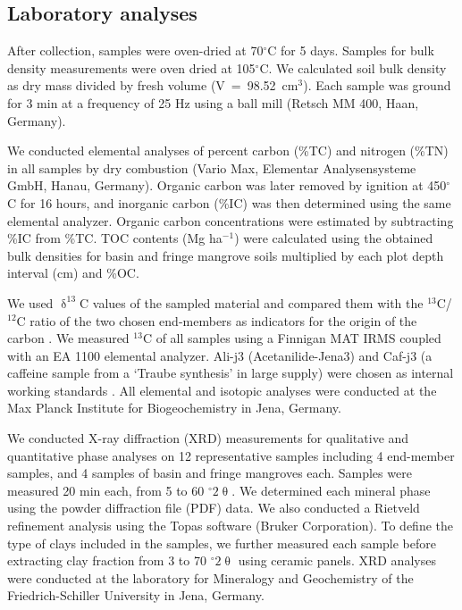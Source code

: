 \subsection{Laboratory analyses}
After collection, samples were oven-dried at 70$^{\circ}$C for 5 days. Samples for bulk density measurements were oven dried at 105$^{\circ}$C. We calculated soil bulk density as dry mass divided by fresh volume \mbox{(V = 98.52 cm$^3$)}. Each sample was ground for 3 min at a frequency of 25 Hz using a ball mill (Retsch MM 400, Haan, Germany). 

We conducted elemental analyses of percent  carbon (\%TC) and nitrogen (\%TN) in all samples by dry combustion (Vario Max, Elementar Analysensysteme GmbH, Hanau, Germany). Organic carbon was later removed by ignition at 450$^{\circ}$C for 16 hours, and inorganic carbon  (\%IC) was then determined using the same elemental analyzer. Organic carbon concentrations were estimated by subtracting \%IC from \%TC. TOC contents (Mg ha$^{-1}$) were calculated using the obtained bulk densities for basin and fringe mangrove soils multiplied by each plot depth interval (cm) and \%OC.

We used $\updelta^{13}$C values of the sampled material and compared them with the  $^{13}$C/$^{12}$C ratio of the two chosen end-members as indicators for the origin of the carbon \citep{Fry2006}. We measured $^{13}$C of all samples using a Finnigan MAT IRMS coupled with an EA 1100 elemental analyzer. Ali-j3 (Acetanilide-Jena3) and Caf-j3 (a caffeine sample from a `Traube synthesis' in large supply) were chosen as internal working standards \citep{werner2001}. All elemental and isotopic analyses were conducted at the Max Planck Institute for Biogeochemistry in Jena, Germany.

We conducted X-ray diffraction (XRD) measurements for qualitative and quantitative phase analyses \citep{spiess2009} on 12 representative samples including 4 end-member samples, and 4 samples of basin and fringe mangroves each. Samples were measured 20 min each, from 5 to 60 $^{\circ}2\uptheta$. We determined each mineral phase using the powder diffraction file (PDF) data. We also conducted a Rietveld refinement analysis using the Topas software (Bruker Corporation). To define the type of clays included in the samples, we further measured each sample before extracting clay fraction from 3 to 70 $^{\circ}2\uptheta$ using ceramic panels. XRD analyses were conducted at the laboratory for Mineralogy and Geochemistry of the Friedrich-Schiller University in Jena, Germany.

